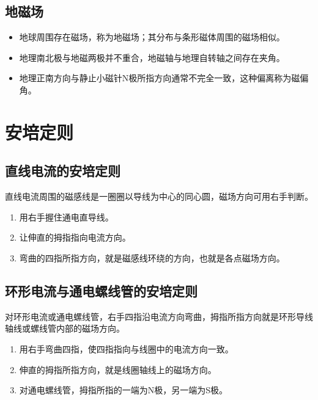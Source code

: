 \documentclass[a4paper,12pt,twoside]{article}
\begin{document}
\subsection{地磁场}
\begin{itemize}
    \item 地球周围存在磁场，称为地磁场；其分布与条形磁体周围的磁场相似。
    \item 地理南北极与地磁两极并不重合，地磁轴与地理自转轴之间存在夹角。
    \item 地理正南方向与静止小磁针N极所指方向通常不完全一致，这种偏离称为磁偏角。
\end{itemize}


\section{安培定则}

\subsection{直线电流的安培定则}
直线电流周围的磁感线是一圈圈以导线为中心的同心圆，磁场方向可用右手判断。
\begin{enumerate}
    \item 用右手握住通电直导线。
    \item 让伸直的拇指指向电流方向。
    \item 弯曲的四指所指方向，就是磁感线环绕的方向，也就是各点磁场方向。
\end{enumerate}


\subsection{环形电流与通电螺线管的安培定则}
对环形电流或通电螺线管，右手四指沿电流方向弯曲，拇指所指方向就是环形导线轴线或螺线管内部的磁场方向。
\begin{enumerate}
    \item 用右手弯曲四指，使四指指向与线圈中的电流方向一致。
    \item 伸直的拇指所指方向，就是线圈轴线上的磁场方向。
    \item 对通电螺线管，拇指所指的一端为N极，另一端为S极。
\end{enumerate}
\end{document}
